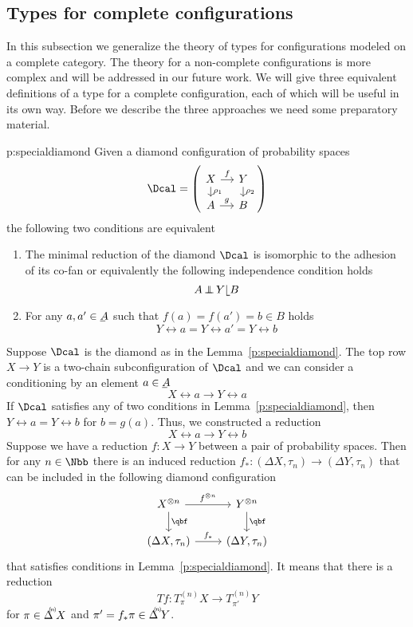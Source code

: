 \subsection{Types for complete configurations}
\label{s:disttypes-types-config}
  In this subsection we generalize the theory of types for
  configurations modeled on a complete category. The theory for a
  non-complete configurations is more complex and will be addressed in
  our future work.  We will give three equivalent definitions of a
  type for a complete configuration, each of which will be useful in
  its own way. Before we describe the three approaches we need some
  preparatory material.
  \begin{lemma}{p:specialdiamond}
    Given a diamond configuration of probability spaces
    \[
    \Dcal=
    \left(
    \begin{tikzcd}[ampersand replacement=\&,row sep=small,column sep=small]
      X
      \arrow{d}{\rho_{1}}
      \arrow{r}{f}
      \&
      Y
      \arrow{d}{\rho_{2}}
      \\
      A
      \arrow{r}{g}
      \&
      B
    \end{tikzcd}
    \right)
    \]
    the following two conditions are equivalent
    \begin{enumerate}
    \item
      \label{p:specialdiamond-indep} 
      The minimal reduction of the diamond $\Dcal$ is isomorphic to the
      adhesion of its co-fan or equivalently the following independence
      condition holds
      \[
      A\indep Y\rel B
      \]
    \item
      \label{p:adhesion-cond}
      For any $a,a'\in \un A$ such that $f(a)=f(a')=b\in B$ holds
      \[
      Y\rel a=Y\rel a'=Y\rel b
      \]
    \end{enumerate}
  \end{lemma}

  Suppose $\Dcal$ is the diamond as in the
  Lemma~\ref{p:specialdiamond}.  The top row $X\to Y$ is a two-chain
  subconfiguration of $\Dcal$ and we can consider a conditioning by an
  element $a\in\un A$
  \[
  X\rel a\to Y\rel a
  \]
  If $\Dcal$ satisfies any of two conditions in
  Lemma~\ref{p:specialdiamond}, then $Y\rel a=Y\rel b$ for
  $b=g(a)$. Thus, we constructed a reduction 
  \[
  X\rel a\to Y\rel b  
  \]
  Suppose we have a reduction $f:X\to Y$ between a pair of probability
  spaces. Then for any $n\in\Nbb$ there is an induced reduction
  $f_{*}:(\Delta X,\tau_{n})\to(\Delta Y,\tau_{n})$ that can be
  included in the following diamond configuration
  \[
  \begin{tikzcd}[ampersand replacement=\&]
    X^{\otimes n} 
    \arrow{r}{f^{\otimes n}}
    \arrow{d}{\emp}
    \& 
    Y^{\otimes n} 
    \arrow{d}{\emp}
    \\
    (\Delta X,\tau_n)
    \arrow{r}{f_{*}}
    \& 
    (\Delta Y,\tau_{n})
  \end{tikzcd}
  \]
  that satisfies conditions in Lemma~\ref{p:specialdiamond}.
  It means that there is a reduction
  \[
  Tf:T^{(n)}_{\pi} X\to T^{(n)}_{\pi'}Y
  \]
  for $\pi\in\Delta^{\!\!\!^{(\!n\!)}}\! X$ and $\pi'=f_{*}\pi\in\Delta^{\!\!\!^{(\!n\!)}}\! Y$.

